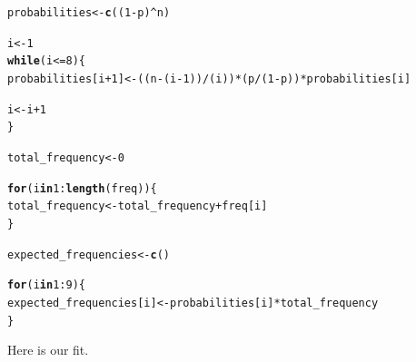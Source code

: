 \documentclass[11pt, a4paper]{article}\usepackage[]{graphicx}\usepackage[]{xcolor}
\makeatletter
\newcommand{\hlnum}[1]{\textcolor[rgb]{0.686,0.059,0.569}{#1}}%
\newcommand{\hlopt}[1]{\textcolor[rgb]{0,0,0}{#1}}%
\newcommand{\hldef}[1]{\textcolor[rgb]{0.345,0.345,0.345}{#1}}%
\newcommand{\hlkwa}[1]{\textcolor[rgb]{0.161,0.373,0.58}{\textbf{#1}}}%
\newcommand{\hlkwb}[1]{\textcolor[rgb]{0.69,0.353,0.396}{#1}}%
\newcommand{\hlkwd}[1]{\textcolor[rgb]{0.737,0.353,0.396}{\textbf{#1}}}%
\newenvironment{kframe}{%
 \def\at@end@of@kframe{}%
 \ifinner\ifhmode%
  \def\at@end@of@kframe{\end{minipage}}%
  \begin{minipage}{\columnwidth}%
 \fi\fi%
 \def\FrameCommand##1{\hskip\@totalleftmargin \hskip-\fboxsep
 \colorbox{shadecolor}{##1}\hskip-\fboxsep
     \hskip-\linewidth \hskip-\@totalleftmargin \hskip\columnwidth}%
 \MakeFramed {\advance\hsize-\width
   \@totalleftmargin\z@ \linewidth\hsize
   \@setminipage}}%
 {\par\unskip\endMakeFramed%
 \at@end@of@kframe}
\newenvironment{knitrout}{}{} %
\makeatother
\begin{document}
\begin{knitrout}
\color{fgcolor}\begin{kframe}
\begin{alltt}
\hldef{probabilities} \hlkwb{<-} \hlkwd{c}\hldef{((}\hlnum{1} \hlopt{-} \hldef{p)}\hlopt{^}\hldef{n)}

\hldef{i} \hlkwb{<-} \hlnum{1}
\hlkwa{while} \hldef{(i} \hlopt{<=} \hlnum{8}\hldef{) \{}
  \hldef{probabilities[i}\hlopt{+}\hlnum{1}\hldef{]} \hlkwb{<-} \hldef{((n}\hlopt{-}\hldef{(i}\hlopt{-}\hlnum{1}\hldef{))} \hlopt{/} \hldef{(i))} \hlopt{*} \hldef{(p} \hlopt{/} \hldef{(}\hlnum{1}\hlopt{-}\hldef{p))} \hlopt{*} \hldef{probabilities[i]}

  \hldef{i} \hlkwb{<-} \hldef{i} \hlopt{+} \hlnum{1}
\hldef{\}}
\end{alltt}
\end{kframe}
\end{knitrout}

\begin{knitrout}
\color{fgcolor}\begin{kframe}
\begin{alltt}
\hldef{total_frequency} \hlkwb{<-} \hlnum{0}

\hlkwa{for} \hldef{(i} \hlkwa{in} \hlnum{1}\hlopt{:}\hlkwd{length}\hldef{(freq)) \{}
  \hldef{total_frequency} \hlkwb{<-} \hldef{total_frequency} \hlopt{+} \hldef{freq[i]}
\hldef{\}}
\end{alltt}
\end{kframe}
\end{knitrout}

\begin{knitrout}
\color{fgcolor}\begin{kframe}
\begin{alltt}
\hldef{expected_frequencies} \hlkwb{<-} \hlkwd{c}\hldef{()}

\hlkwa{for} \hldef{(i} \hlkwa{in} \hlnum{1}\hlopt{:}\hlnum{9}\hldef{) \{}
  \hldef{expected_frequencies[i]} \hlkwb{<-} \hldef{probabilities[i]} \hlopt{*} \hldef{total_frequency}
\hldef{\}}
\end{alltt}
\end{kframe}
\end{knitrout}

Here is our fit.
\end{document}

